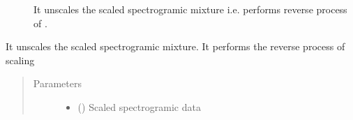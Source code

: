 \documentclass[letterpaper,10pt,english]{sphinxmanual}
\begin{document}
\begin{fulllineitems}
\begin{fulllineitems}
\begin{sphinxVerbatim}[commandchars=\\\{\}]
  \PYG{p}{[}\PYG{p}{[}    \PYG{p}{]}\PYG{p}{[}    \PYG{p}{]}\PYG{p}{]}
  
\PYG{g+go}{[[0.         0.68273064 0.851306   0.25795466 1.        ]}
\PYG{g+go}{ [0.         0.25795466 0.         0.         0.48812467]]}
\end{sphinxVerbatim}



\begin{description}
\item[{{\hyperref[\detokenize{docs/source/preprocess:preprocess.preprocess_tools.Scaler.unscale}]{}}}] \leavevmode
It unscales the scaled spectrogramic mixture i.e. performs reverse process of .

\end{description}



\end{fulllineitems}


\begin{fulllineitems}
\label{\detokenize{docs/source/preprocess:preprocess.preprocess_tools.Scaler.unscale}}
It unscales the scaled spectrogramic mixture.
It performs the reverse process of scaling
\begin{quote}\begin{description}
\item[{Parameters}] \leavevmode\begin{itemize}
\item {} 
 () \textendash{} Scaled spectrogramic data


\end{itemize}
\end{description}
\end{quote}
\end{fulllineitems}
\end{fulllineitems}
\end{document}
